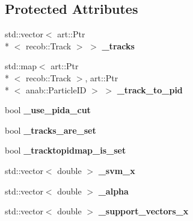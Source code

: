 \subsection*{Protected Attributes}
\begin{DoxyCompactItemize}
\item 
\hypertarget{classubana_1_1MuonCandidateFinder_aa7c96f8b784bcd81512e9c444806f740}{std\-::vector$<$ art\-::\-Ptr\\*
$<$ recob\-::\-Track $>$ $>$ {\bfseries \-\_\-tracks}}\label{classubana_1_1MuonCandidateFinder_aa7c96f8b784bcd81512e9c444806f740}

\item 
\hypertarget{classubana_1_1MuonCandidateFinder_a673e9b7d68a2c3c734fd92ec6e0a87ee}{std\-::map$<$ art\-::\-Ptr\\*
$<$ recob\-::\-Track $>$, art\-::\-Ptr\\*
$<$ anab\-::\-Particle\-I\-D $>$ $>$ {\bfseries \-\_\-track\-\_\-to\-\_\-pid}}\label{classubana_1_1MuonCandidateFinder_a673e9b7d68a2c3c734fd92ec6e0a87ee}

\item 
\hypertarget{classubana_1_1MuonCandidateFinder_a4f0eef92dcbab86d2470da30739be235}{bool {\bfseries \-\_\-use\-\_\-pida\-\_\-cut}}\label{classubana_1_1MuonCandidateFinder_a4f0eef92dcbab86d2470da30739be235}

\item 
\hypertarget{classubana_1_1MuonCandidateFinder_a7275929ef39e422785e7a6dd9d95f5eb}{bool {\bfseries \-\_\-tracks\-\_\-are\-\_\-set}}\label{classubana_1_1MuonCandidateFinder_a7275929ef39e422785e7a6dd9d95f5eb}

\item 
\hypertarget{classubana_1_1MuonCandidateFinder_a46cb4b649e6d2d9b2e6c7641a9fd548a}{bool {\bfseries \-\_\-tracktopidmap\-\_\-is\-\_\-set}}\label{classubana_1_1MuonCandidateFinder_a46cb4b649e6d2d9b2e6c7641a9fd548a}

\item 
\hypertarget{classubana_1_1MuonCandidateFinder_ab09c2e9c8419eb520850e8e8ce3d9518}{std\-::vector$<$ double $>$ {\bfseries \-\_\-svm\-\_\-x}}\label{classubana_1_1MuonCandidateFinder_ab09c2e9c8419eb520850e8e8ce3d9518}

\item 
\hypertarget{classubana_1_1MuonCandidateFinder_acb4356a1692fa77c2784d09599ce8fa1}{std\-::vector$<$ double $>$ {\bfseries \-\_\-alpha}}\label{classubana_1_1MuonCandidateFinder_acb4356a1692fa77c2784d09599ce8fa1}

\item 
\hypertarget{classubana_1_1MuonCandidateFinder_a77c96b071b39a3ce14e00d0b233d4cc4}{std\-::vector$<$ double $>$ {\bfseries \-\_\-support\-\_\-vectors\-\_\-x}}\label{classubana_1_1MuonCandidateFinder_a77c96b071b39a3ce14e00d0b233d4cc4}


\end{DoxyCompactItemize}
